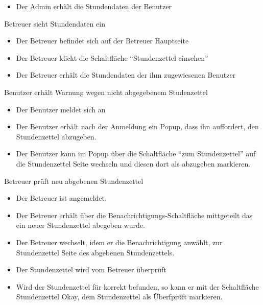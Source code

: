 \begin{requirements}
\begin{itemize}
		\item Der Admin erhält die Stundendaten der Benutzer
	\end {itemize}
	 Betreuer sieht Stundendaten ein
	\begin{itemize}
		\item Der Betreuer befindet sich auf der Betreuer Hauptseite
		\item Der Betreuer klickt die Schaltfläche "`Stundenzettel einsehen"'
		\item Der Betreuer erhält die Stundendaten der ihm zugewiesenen Benutzer
	\end {itemize}
	 Benutzer erhält Warnung wegen nicht abgegebenem Studenzettel
    \begin{itemize}
		\item Der Benutzer meldet sich an
		\item Der Benutzer erhält nach der Anmeldung ein Popup, dass ihn auffordert, den Stundenzettel abzugeben.
		\item Der Benutzer kann im Popup über die Schaltfläche "`zum Stundenzettel"' auf die Stundenzettel Seite wechseln und diesen dort als abzugeben markieren.
	\end {itemize}

	 Betreuer prüft neu abgebenen Stundenzettel
	\begin{itemize}
	    \item Der Betreuer ist angemeldet.
	    \item Der Betreuer erhält über die Benachrichtigungs-Schaltfläche mittgeteilt das ein neuer Stundenzettel abegeben wurde.
	    \item Der Betreuer wechselt, idem er die Benachrichtigung anwählt, zur Stundenzettel Seite des abgebenen Stundenzettels.
	    \item Der Stundenzettel wird vom Betreuer überprüft
	    \item Wird der Stundenzettel für korrekt befunden, so kann er mit der Schaltfläche Stundenzettel Okay, dem Stundenzettel als Überfprüft markieren.
	\end{itemize}

\end{requirements}
